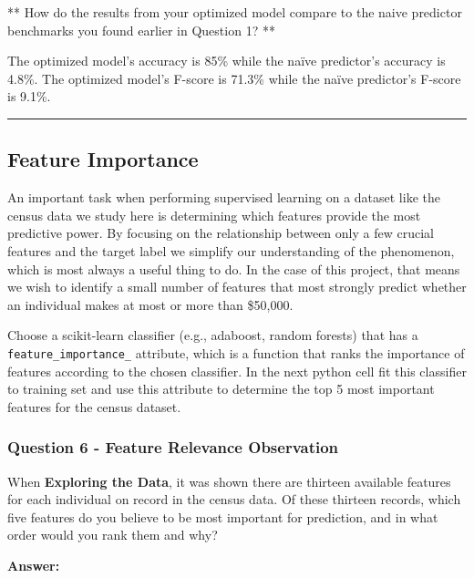 \documentclass[11pt]{article}
\begin{document}
** How do the results from your optimized model compare to the naive
predictor benchmarks you found earlier in Question 1? **

The optimized model's accuracy is 85\% while the naïve predictor's
accuracy is 4.8\%. The optimized model's F-score is 71.3\% while the
naïve predictor's F-score is 9.1\%.

    \begin{center}\rule{0.5\linewidth}{\linethickness}\end{center}

\hypertarget{feature-importance}{%
\subsection{Feature Importance}\label{feature-importance}}

An important task when performing supervised learning on a dataset like
the census data we study here is determining which features provide the
most predictive power. By focusing on the relationship between only a
few crucial features and the target label we simplify our understanding
of the phenomenon, which is most always a useful thing to do. In the
case of this project, that means we wish to identify a small number of
features that most strongly predict whether an individual makes at most
or more than \$50,000.

Choose a scikit-learn classifier (e.g., adaboost, random forests) that
has a \texttt{feature\_importance\_} attribute, which is a function that
ranks the importance of features according to the chosen classifier. In
the next python cell fit this classifier to training set and use this
attribute to determine the top 5 most important features for the census
dataset.

    \hypertarget{question-6---feature-relevance-observation}{%
\subsubsection{Question 6 - Feature Relevance
Observation}\label{question-6---feature-relevance-observation}}

When \textbf{Exploring the Data}, it was shown there are thirteen
available features for each individual on record in the census data. Of
these thirteen records, which five features do you believe to be most
important for prediction, and in what order would you rank them and why?

    \textbf{Answer:}
\end{document}
